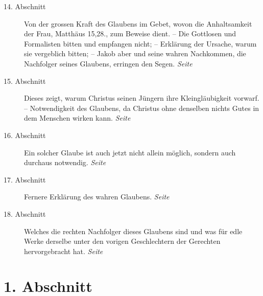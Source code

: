 \begin{description}
\item[14. Abschnitt] Von der grossen Kraft des Glaubens im Gebet, wovon die
Anhaltsamkeit
der Frau, Matthäus 15,28., zum Beweise dient. -- Die Gottlosen
und Formalisten bitten und empfangen nicht; -- Erklärung der Ursache, warum sie
vergeblich bitten; -- Jakob aber und seine wahren Nachkommen, die Nachfolger
seines Glaubens, erringen
den Segen.
\dotfill \textit{Seite~\pageref{kap6_ab14}}\\
\item[15. Abschnitt] Dieses zeigt, warum Christus seinen Jüngern ihre
Kleingläubigkeit vorwarf. -- Notwendigkeit des Glaubens, da Christus ohne
denselben nichts Gutes in dem Menschen wirken kann.
\dotfill \textit{Seite~\pageref{kap6_ab15}}\\
\item[16. Abschnitt] Ein solcher Glaube ist auch jetzt nicht allein möglich,
sondern auch durchaus notwendig.
\dotfill \textit{Seite~\pageref{kap6_ab16}}\\
\item[17. Abschnitt] Fernere Erklärung des wahren Glaubens.
\dotfill \textit{Seite~\pageref{kap6_ab17}}\\
\item[18. Abschnitt] Welches die rechten Nachfolger dieses Glaubens sind und
was für edle Werke derselbe unter den vorigen Geschlechtern der Gerechten
hervorgebracht hat.
\dotfill \textit{Seite~\pageref{kap6_ab18}}\\

\end{description}

\newpage

\section{1. Abschnitt} \label{kap6_ab1}

